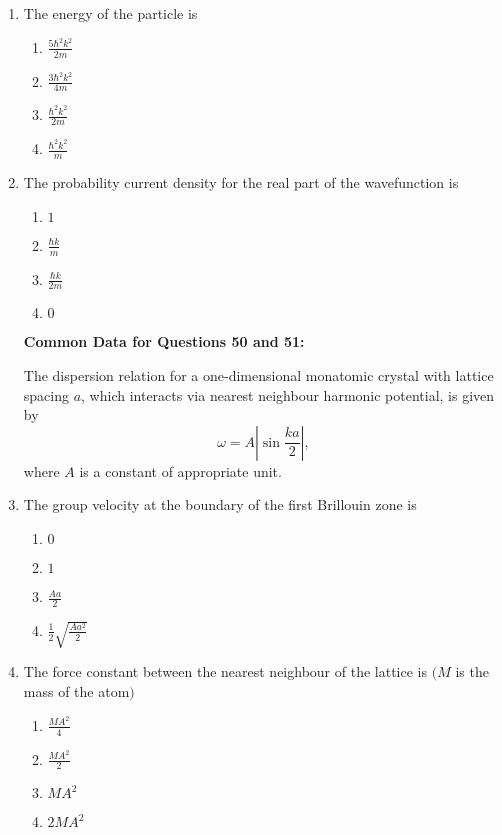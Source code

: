 \documentclass[article]{IEEEtran}
\numberwithin{figure}{enumi}
\begin{document}
\begin{enumerate}
        \item The energy of the particle is
        \begin{enumerate}
            \item $\frac{5\hbar^2 k^2}{2m}$\\
            \item $\frac{3\hbar^2 k^2}{4m}$\\
            \item $\frac{\hbar^2 k^2}{2m}$\\
            \item $\frac{\hbar^2 k^2}{m}$
        \end{enumerate}

        \item The probability current density for the real part of the wavefunction is
        \begin{enumerate}
            \item $1$
            \item $\frac{\hbar k}{m}$
            \item $\frac{\hbar k}{2m}$
            \item $0$
        \end{enumerate}

\textbf{Common Data for Questions 50 and 51:}

The dispersion relation for a one-dimensional monatomic crystal with lattice spacing $a$, which interacts via nearest neighbour harmonic potential, is given by
    \begin{equation*}
    \omega = A \left| \sin \frac{ka}{2} \right|,
    \end{equation*}
where $A$ is a constant of appropriate unit.

    
        \item The group velocity at the boundary of the first Brillouin zone is
        \begin{enumerate}
            \item $0$
            \item $1$
            \item $\frac{Aa}{2}$
            \item $\frac{1}{2} \sqrt{\frac{Aa^2}{2}}$
        \end{enumerate}

        \item The force constant between the nearest neighbour of the lattice is $(M$ is the mass of the atom$)$
        \begin{enumerate}
            \item $\frac{M A^2}{4}$
            \item $\frac{M A^2}{2}$
            \item $M A^2$
            \item $2 M A^2$
        \end{enumerate}
   

\end{enumerate}
\end{document}
